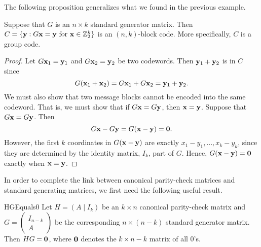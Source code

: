  The following proposition  generalizes what we found in the previous example.
 
 \begin{prop}{}
Suppose that $G$ is an $n \times k$  standard generator matrix.  Then
\mbox{$C = \{ {\bold y} : G {\bold x} ={\bold y} \mbox{ for ${\bold x} \in
{\Bbb  Z}_2^k$} \}$} is an  $(n,k)$-block code. More specifically, $C$
is a group code.  
\end{prop}
 
 \begin{proof}
Let $G {\bold x}_1 = {\bold y}_1$ and $G {\bold
x}_2 ={\bold y}_2$ be two codewords. Then ${\bold y}_1
+ {\bold y}_2$ is in $C$ since 
\[
G( {\bold x}_1 + {\bold x}_2)
=
G {\bold x}_1 + G {\bold x}_2
=
{\bold y}_1 + {\bold y}_2.
\]
We must also show that two message blocks  cannot be encoded into the
same codeword. That is, we must show that if $G {\bold x} = G
{\bold y}$, then ${\bold x} = {\bold y}$.  Suppose that $G
{\bold x} = G {\bold y}$. Then
\[
G {\bold x} - G {\bold y}
=
G( {\bold x} - {\bold y})
=
{\bold 0}.
\]
However, the first $k$ coordinates in $G( {\bold x} - {\bold
y})$ are exactly $x_1 -y_1, \ldots, x_k - y_k$, since they are
determined by the identity matrix, $I_k$, part of $G$. Hence, $G(
{\bold x} - {\bold y}) = {\bold 0}$ exactly when
${\bold x} = {\bold y}$.
\end{proof}
 
 In order to complete the link between canonical parity-check
matrices and standard generating matrices, we first need the following useful result.
 
 \begin{prop}{HGEquals0}
Let $H = (A \mid I_k )$ be an $k \times n$ canonical parity-check
matrix and $G = \left(
 \begin{array}{c}
 I_{n-k} \\
A
 \end{array} \right)$ be the
corresponding $n \times (n-k)$ standard generator matrix. Then $HG =
{\bold 0}$, where  ${\bold 0}$ denotes the $k \times n-k$ matrix of all 0's.
\end{prop}
  
